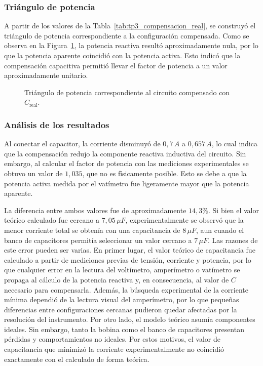 \subsubsection{Triángulo de potencia}

A partir de los valores de la Tabla~\ref{tab:tp3_compensacion_real}, se construyó el triángulo de potencia correspondiente a la configuración compensada. Como se observa en la Figura~\ref{fig:triangulo_compensacion}, la potencia reactiva resultó aproximadamente nula, por lo que la potencia aparente coincidió con la potencia activa. Esto indicó que la compensación capacitiva permitió llevar el factor de potencia a un valor aproximadamente unitario.

\begin{figure}[H]
    \centering
    \caption{Triángulo de potencia correspondiente al circuito compensado con $C_{\text{real}}$.}
    \label{fig:triangulo_compensacion}
\end{figure}

\subsubsection{Análisis de los resultados}

Al conectar el capacitor, la corriente disminuyó de \(0{,}7\,A\) a \(0{,}657\,A\), lo cual indica que la compensación redujo la componente reactiva inductiva del circuito. Sin embargo, al calcular el factor de potencia con las mediciones experimentales se obtuvo un valor de \(1{,}035\), que no es físicamente posible. Esto se debe a que la potencia activa medida por el vatímetro fue ligeramente mayor que la potencia aparente.

La diferencia entre ambos valores fue de aproximadamente \(14{,}3\%\). Si bien el valor teórico calculado fue cercano a \(7{,}05\,\mu F\), experimentalmente se observó que la menor corriente total se obtenía con una capacitancia de \(8\,\mu F\), aun cuando el banco de capacitores permitía seleccionar un valor cercano a \(7\,\mu F\). Las razones de este error pueden ser varias. En primer lugar, el valor teórico de capacitancia fue calculado a partir de mediciones previas de tensión, corriente y potencia, por lo que cualquier error en la lectura del voltímetro, amperímetro o vatímetro se propaga al cálculo de la potencia reactiva y, en consecuencia, al valor de \(C\) necesario para compensarla. Además, la búsqueda experimental de la corriente mínima dependió de la lectura visual del amperímetro, por lo que pequeñas diferencias entre configuraciones cercanas pudieron quedar afectadas por la resolución del instrumento. Por otro lado, el modelo teórico asumía componentes ideales. Sin embargo, tanto la bobina como el banco de capacitores presentan pérdidas y comportamientos no ideales. Por estos motivos, el valor de capacitancia que minimizó la corriente experimentalmente no coincidió exactamente con el calculado de forma teórica.

